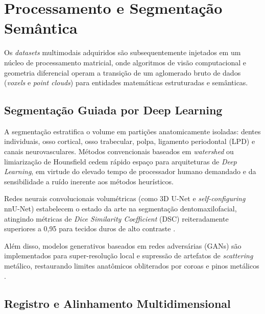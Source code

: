 \section{Processamento e Segmentação Semântica}
\label{sec:processamento}

Os \textit{datasets} multimodais adquiridos são subsequentemente injetados em um núcleo de processamento matricial, onde algoritmos de visão computacional e geometria diferencial operam a transição de um aglomerado bruto de dados (\textit{voxels} e \textit{point clouds}) para entidades matemáticas estruturadas e semânticas. 

\subsection{Segmentação Guiada por Deep Learning}
\label{subsec:segmentacao-pipeline}

A segmentação estratifica o volume em partições anatomicamente isoladas: dentes individuais, osso cortical, osso trabecular, polpa, ligamento periodontal (LPD) e canais neurovasculares. Métodos convencionais baseados em \textit{watershed} ou limiarização de Hounsfield cedem rápido espaço para arquiteturas de \textit{Deep Learning}, em virtude do elevado tempo de processador humano demandado e da sensibilidade a ruído inerente aos métodos heurísticos.

Redes neurais convolucionais volumétricas (como 3D U-Net e \textit{self-configuring} nnU-Net) estabelecem o estado da arte na segmentação dentomaxilofacial, atingindo métricas de \textit{Dice Similarity Coefficient} (DSC) reiteradamente superiores a 0,95 para tecidos duros de alto contraste \cite{elsaid2025digital}. 


Além disso, modelos generativos baseados em redes adversárias (GANs) são implementados para super-resolução local e supressão de artefatos de \textit{scattering} metálico, restaurando limites anatômicos obliterados por coroas e pinos metálicos \cite{nature2026digital}.

\subsection{Registro e Alinhamento Multidimensional}
\label{subsec:registro}

